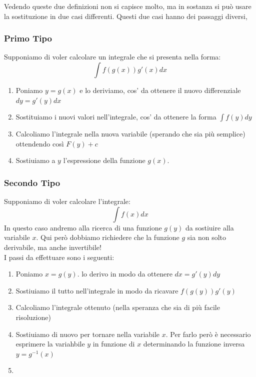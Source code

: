 \documentclass[12pt, a4paper, openany]{book}
\begin{document}

	Vedendo queste due definizioni non si capisce molto,
	ma in sostanza si può usare la sostituzione in due casi differenti.
	Questi due casi hanno dei passaggi diversi,
	\subsubsection*{Primo Tipo}
	Supponiamo di voler calcolare un integrale che si presenta nella forma:
	$$\int f(g(x)) g'(x) dx$$
	\begin{enumerate}
		\item Poniamo $y=g(x)$ e lo deriviamo, cos' da ottenere il nuovo differenziale $dy = g'(y)dx$
		\item Sostituiamo i nuovi valori nell'integrale, cos' da ottenere la forma $\int f(y) dy$
		\item Calcoliamo l'integrale nella nuova variabile (sperando che sia più semplice) ottendendo così $F(y) + c$
		\item Sostiuiamo a $y$ l'espressione della funzione $g(x)$.
	\end{enumerate}
	\subsubsection*{Secondo Tipo}
	Supponiamo di voler calcolare l'integrale: $$\int f(x)dx$$
	In questo caso andremo alla ricerca di una funzione $g(y)$ da sostiuire alla variabile $x$.
	Qui però dobbiamo richiedere che la funzione $g$ sia non solto derivabile, ma anche invertibile!
	\\I passi da effettuare sono i seguenti:
	\begin{enumerate}
		\item Poniamo $x=g(y)$. lo derivo in modo da ottenere $dx=g'(y)dy$
		\item Sostiuiamo il tutto nell'integrale in modo da ricavare $f(g(y))g'(y)$
		\item Calcoliamo l'integrale ottenuto (nella speranza che sia di più facile risoluzione)
		\item Sostiuiamo di nuovo per tornare nella variabile $x$. Per farlo però è necessario esprimere la variahbile $y$ in funzione di $x$ determinando la funzione inversa $y=g^{-1}(x)$
		\item 
	\end{enumerate}
\end{document}
